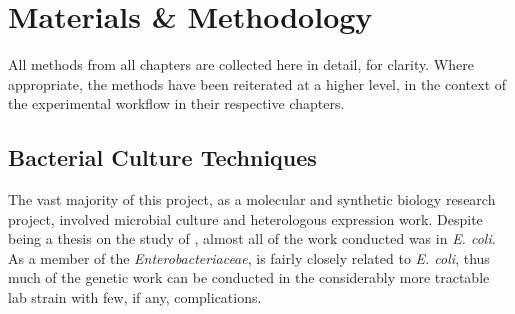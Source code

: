 \pagestyle{IHA-fancy-style}


\chapter{Materials \& Methodology}\label{methods}

All methods from all chapters are collected here in detail, for clarity. Where appropriate, the methods have been reiterated at a higher level, in the context of the experimental workflow in their respective chapters.

%
%
%


\section{Bacterial Culture Techniques}
The vast majority of this project, as a molecular and synthetic biology research project,  involved microbial culture and heterologous expression work. Despite being a thesis on the study of \Pa, almost all of the work conducted was in \emph{E. coli}. As a member of the \emph{Enterobacteriaceae}, \Pa{} is fairly closely related to \emph{E. coli}, thus much of the genetic work can be conducted in the considerably more tractable lab strain with few, if any, complications.


